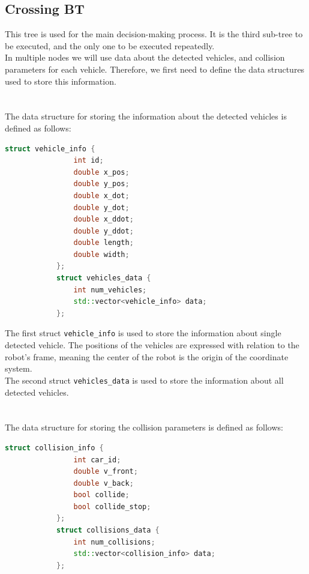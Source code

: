 \subsection{Crossing BT}
\label{sec:Crossing-BT-impl}
    This tree is used for the main decision-making process. It is the third sub-tree to be executed, and the only one to be executed repeatedly.\\
    In multiple nodes we will use data about the detected vehicles, and collision parameters for each vehicle. Therefore, we first need to define the data structures used to store this information.\\\\
    \\
        The data structure for storing the information about the detected vehicles is defined as follows:
        \begin{lstlisting}[language=C++, caption={Vehicle data structure}, label={lst:vehicle_data}]
            struct vehicle_info {
                int id;
                double x_pos;
                double y_pos;
                double x_dot;
                double y_dot;
                double x_ddot;
                double y_ddot;
                double length;
                double width;
            };
            struct vehicles_data {
                int num_vehicles;
                std::vector<vehicle_info> data;
            };
        \end{lstlisting}
        The first struct \texttt{vehicle\_info} is used to store the information about single detected vehicle. The positions of the vehicles are expressed with relation to the robot's frame, meaning the center of the robot is the origin of the coordinate system.\\
        The second struct \texttt{vehicles\_data} is used to store the information about all detected vehicles.\\\\
    \\
        The data structure for storing the collision parameters is defined as follows:
        \begin{lstlisting}[language=C++, caption={Collision data structure}, label={lst:collision_data}]
            struct collision_info {
                int car_id;
                double v_front;
                double v_back;
                bool collide;
                bool collide_stop;
            };
            struct collisions_data {
                int num_collisions;
                std::vector<collision_info> data;
            };
        \end{lstlisting}
